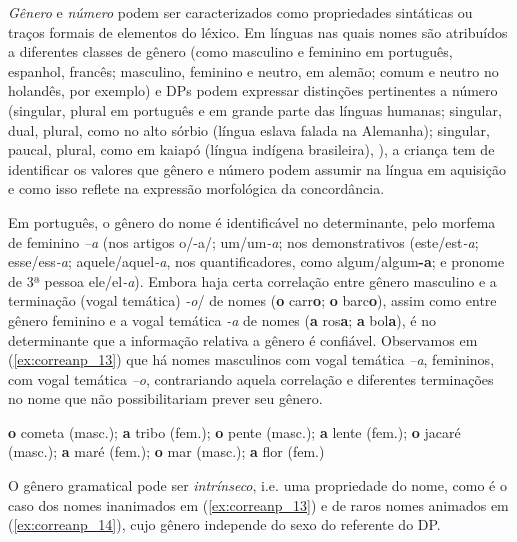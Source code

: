 \documentclass[output=paper]{LSP/langsci}
\begin{document}
\textit{Gênero} e \textit{número} podem ser caracterizados como propriedades sintáticas ou traços formais de elementos do léxico. Em línguas nas quais nomes são atribuídos a diferentes classes de gênero (como masculino e feminino em português, espanhol, francês; masculino, feminino e neutro, em alemão; comum e neutro no holandês, por exemplo) e DPs podem expressar distinções pertinentes a número (singular, plural em português e em grande parte das línguas humanas; singular, dual, plural, como no alto sórbio (língua eslava falada na Alemanha); singular, paucal, plural, como em kaiapó (língua indígena brasileira), \citealt{corbett2000}), a criança tem de identificar os valores que gênero e número podem assumir na língua em aquisição e como isso reflete na expressão morfológica da concordância.

Em português, o gênero do nome é identificável no determinante, pelo morfema de feminino \textit{–a} (nos artigos o/-a/; um/um\textit{-a}; nos demonstrativos (este/est\textit{-a}; esse/ess\textit{-a}; aquele/aquel\textit{-a}, nos quantificadores, como algum/algum\textbf{-a}; e pronome de 3ª pessoa ele/el\textit{-a}).  Embora haja certa correlação entre gênero masculino e a terminação (vogal temática) \textit{-o}/ de nomes (\textbf{o} carr\textbf{o}; \textbf{o} barc\textbf{o}), assim como entre gênero feminino e a vogal temática \textit{-a} de nomes (\textbf{a} ros\textbf{a}; \textbf{a} bol\textbf{a}), é no determinante que a informação relativa a gênero é confiável.  Observamos em (\ref{ex:correanp_13}) que há nomes masculinos com vogal temática \textit{–a}, femininos, com vogal temática \textit{–o}, contrariando aquela correlação e diferentes terminações no nome que não possibilitariam prever seu gênero.

\ea\label{ex:correanp_13}
\textbf{o} cometa (masc.); \textbf{a} tribo (fem.); \textbf{o} pente (masc.); \textbf{a} lente (fem.); \textbf{o} jacaré (masc.); \textbf{a} maré (fem.); \textbf{o} mar (masc.); \textbf{a} flor (fem.)
\z

O gênero gramatical pode ser \textit{intrínseco}, i.e. uma propriedade do nome, como é o caso dos nomes inanimados em (\ref{ex:correanp_13}) e de raros nomes animados em (\ref{ex:correanp_14}), cujo gênero independe do sexo do referente do DP.
\end{document}
